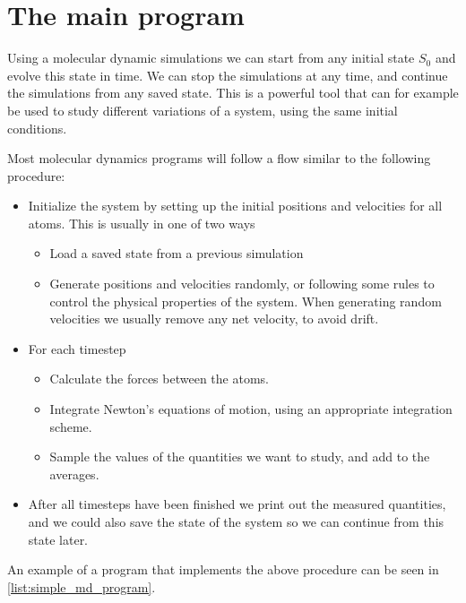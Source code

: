 \section{The main program}
%
Using a molecular dynamic simulations we can start from any initial state $S_0$ and evolve this state in time. We can stop the simulations at any time, and continue the simulations from any saved state. This is a powerful tool that can for example be used to study different variations of a system, using the same initial conditions.

Most molecular dynamics programs will follow a flow similar to the following procedure:
%
\begin{itemize}[midsep]
    \renewcommand{\labelitemii}{$\bullet$} %
    \item Initialize the system by setting up the initial positions and velocities for all atoms. This is usually in one of two ways
    \begin{itemize}[midsep]
        \item Load a saved state from a previous simulation
        \item Generate positions and velocities randomly, or following some rules to control the physical properties of the system. When generating random velocities we usually remove any net velocity, to avoid drift.
    \end{itemize}
    \item For each timestep
    \begin{itemize}[midsep]
        \item Calculate the forces between the atoms.
        \item Integrate Newton's equations of motion, using an appropriate integration scheme.
        \item Sample the values of the quantities we want to study, and add to the averages.
    \end{itemize}
    \item After all timesteps have been finished we print out the measured quantities, and we could also save the state of the system so we can continue from this state later.
\end{itemize}
%
An example of a program that implements the above procedure can be seen in \cref{list:simple_md_program}.
%
